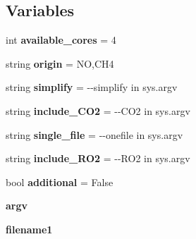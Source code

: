 \subsection*{Variables}
\begin{DoxyCompactItemize}
\item 
\mbox{\label{namespaceMCM__subset__new_af78e4740b5945fa71f463bd8ea9890d2}} 
int {\bfseries available\+\_\+cores} = 4
\item 
\mbox{\label{namespaceMCM__subset__new_af24d72e4e4b80591fd9154204f71dccb}} 
string {\bfseries origin} = \textquotesingle{}NO,C\+H4\textquotesingle{}
\item 
\mbox{\label{namespaceMCM__subset__new_a9d434019e867f295cb1242e23d253bcb}} 
string {\bfseries simplify} = \textquotesingle{}-\/-\/simplify\textquotesingle{} in sys.\+argv
\item 
\mbox{\label{namespaceMCM__subset__new_a12295ccf338456707f7867dcfcf17fc6}} 
string {\bfseries include\+\_\+\+C\+O2} = \textquotesingle{}-\/-\/C\+O2\textquotesingle{} in sys.\+argv
\item 
\mbox{\label{namespaceMCM__subset__new_abffee1858c11fb4855c9f16016c66bd9}} 
string {\bfseries single\+\_\+file} = \textquotesingle{}-\/-\/onefile\textquotesingle{} in sys.\+argv
\item 
\mbox{\label{namespaceMCM__subset__new_a475d21acc1d9ccd962d94d2f9f20fb1e}} 
string {\bfseries include\+\_\+\+R\+O2} = \textquotesingle{}-\/-\/R\+O2\textquotesingle{} in sys.\+argv
\item 
\mbox{\label{namespaceMCM__subset__new_a79385b4b8d4d9c3e17aac41b156b1079}} 
bool {\bfseries additional} = False
\item 
\mbox{\label{namespaceMCM__subset__new_aebc01f012e97195fe50e74d23357dc85}} 
{\bfseries argv}
\item 
\mbox{\label{namespaceMCM__subset__new_aff5fa765f833d6adfac5021a33552830}} 
{\bfseries filename1}

\end{DoxyCompactItemize}
